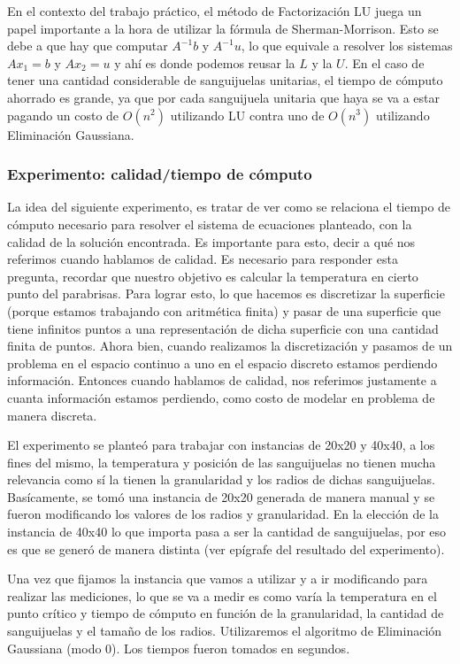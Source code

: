 \par En el contexto del trabajo práctico, el método de Factorización LU juega un papel importante a la hora de utilizar la fórmula de Sherman-Morrison. Esto se debe a que hay que computar $A^{-1}b$ y $A^{-1}u$, lo que equivale a resolver los sistemas $Ax_1 = b$ y $Ax_2 = u$ y ahí es donde podemos reusar la $L$ y la $U$. En el caso de tener una cantidad considerable de sanguijuelas unitarias, el tiempo de cómputo ahorrado es grande, ya que por cada sanguijuela unitaria que haya se va a estar pagando un costo de $O(n^2)$ utilizando LU contra uno de $O(n^3)$ utilizando Eliminación Gaussiana.
\subsubsection{Experimento: calidad/tiempo de cómputo}
La idea del siguiente experimento, es tratar de ver como se relaciona el tiempo de cómputo necesario para resolver el sistema de ecuaciones planteado, con la calidad de la solución encontrada. Es importante para esto, decir a qué nos referimos cuando hablamos de calidad. Es necesario para responder esta pregunta, recordar que nuestro objetivo es calcular la temperatura en cierto punto del parabrisas. Para lograr esto, lo que hacemos es discretizar la superficie (porque estamos trabajando con aritmética finita) y pasar de una superficie que tiene infinitos puntos a una representación de dicha superficie con una cantidad finita de puntos. Ahora bien, cuando realizamos la discretización y pasamos de un problema en el espacio continuo a uno en el espacio discreto estamos perdiendo información. Entonces cuando hablamos de calidad, nos referimos justamente a cuanta información estamos perdiendo, como costo de modelar en problema de manera discreta.
\par El experimento se planteó para trabajar con instancias de 20x20 y 40x40, a los fines del mismo, la temperatura y posición de las sanguijuelas no tienen mucha relevancia como sí la tienen la granularidad y los radios de dichas sanguijuelas. Basícamente, se tomó una instancia de 20x20 generada de manera manual y se fueron modificando los valores de los radios y granularidad. En la elección de la instancia de 40x40 lo que importa pasa a ser la cantidad de sanguijuelas, por eso es que se generó de manera distinta (ver epígrafe del resultado del experimento).
\par Una vez que fijamos la instancia que vamos a utilizar y a ir modificando para realizar las mediciones, lo que se va a medir es como varía la temperatura en el punto crítico y tiempo de cómputo en función de la granularidad, la cantidad de sanguijuelas y el tamaño de los radios. Utilizaremos el algoritmo de Eliminación Gaussiana (modo 0). Los tiempos fueron tomados en segundos.
